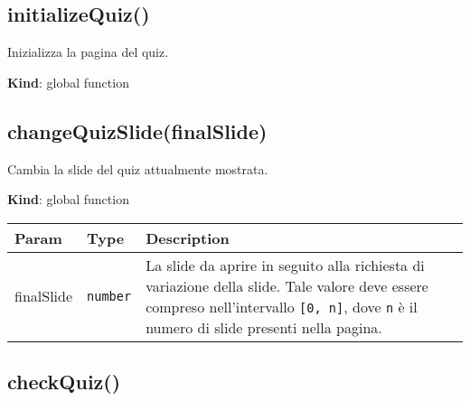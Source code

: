 \protect\hypertarget{initializeQuiz}{}{}

\hypertarget{initializequiz}{%
\subsection{initializeQuiz()}\label{initializequiz}}

Inizializza la pagina del quiz.

\textbf{Kind}: global function\\
\protect\hypertarget{changeQuizSlide}{}{}

\hypertarget{changequizslidefinalslide}{%
\subsection{changeQuizSlide(finalSlide)}\label{changequizslidefinalslide}}

Cambia la slide del quiz attualmente mostrata.

\textbf{Kind}: global function

\begin{longtabu} to \textwidth {X[1,L,m]X[1,L,m]X[1.5,L,m]}
\toprule
\begin{minipage}[b]{0.30\columnwidth}\raggedright
Param\strut
\end{minipage} & \begin{minipage}[b]{0.30\columnwidth}\raggedright
Type\strut
\end{minipage} & \begin{minipage}[b]{0.30\columnwidth}\raggedright
Description\strut
\end{minipage}\tabularnewline
\midrule
\endhead
\begin{minipage}[t]{0.30\columnwidth}\raggedright
finalSlide\strut
\end{minipage} & \begin{minipage}[t]{0.30\columnwidth}\raggedright
\texttt{number}\strut
\end{minipage} & \begin{minipage}[t]{0.30\columnwidth}\raggedright
La slide da aprire in seguito alla richiesta di variazione della slide.
Tale valore deve essere compreso nell'intervallo \texttt{{[}0,\ n{]}},
dove \texttt{n} è il numero di slide presenti nella pagina.\strut
\end{minipage}\tabularnewline
\bottomrule
\end{longtabu}

\protect\hypertarget{checkQuiz}{}{}

\hypertarget{checkquiz}{%
\subsection{checkQuiz()}\label{checkquiz}}

